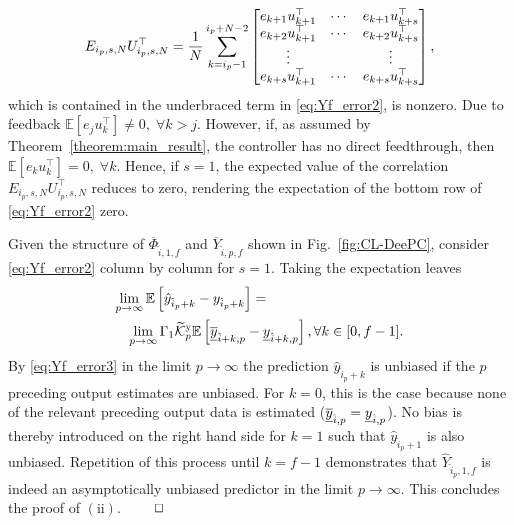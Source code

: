 \begin{align}
E_{i_p,s,N}U_{i_p,s,N}^\top =
    \frac{1}{N}\sum\limits_{k=i_p-1}^{i_p+N-2}
    \begin{bmatrix}
        e_{k+1} u_{k+1}^\top & \cdots & e_{k+1} u_{k+s}^\top\\
        e_{k+2} u_{k+1}^\top & \cdots & e_{k+2} u_{k+s}^\top\\
        \vdots &  & \vdots\\
        e_{k+s}u_{k+1}^\top & \cdots & e_{k+s}u_{k+s}^\top
    \end{bmatrix},\notag%
\end{align}
which is contained in the underbraced term in \eqref{eq:Yf_error2}, is nonzero. Due to feedback $\mathbb{E}[e_j u_k^\top]\neq 0,\;\forall k>j$. However, if, as assumed by Theorem~\ref{theorem:main_result}, the controller has no direct feedthrough, then $\mathbb{E}[e_k u_k^\top]= 0,\;\forall k$. %
Hence, if ${s=1}$, the expected value of the correlation $E_{i_p,s,N}U_{i_p,s,N}^\top$ reduces to zero, rendering the expectation of the bottom row of \eqref{eq:Yf_error2} zero.

Given the structure of $\overline{\Phi}_{\hat{i},1,f}$ and $\overline{Y}_{\hat{i},p,f}$ shown in Fig.~\ref{fig:CL-DeePC}, consider \eqref{eq:Yf_error2} column by column for $s=1$. Taking the expectation leaves
\begin{align}\label{eq:Yf_error3}
\begin{split}
    &\mkern-3mu\lim_{p\rightarrow\infty} \mathbb{E}\left[\hat{y}_{\hat{i}_p+k}-y_{\hat{i}_p+k}\right] = \\ &\;\;\;\lim_{p\rightarrow\infty}\Gamma_1\widetilde{\mathcal{K}}_{p}^{\mathrm{{y}}}\mathbb{E}\left[\underline{\overline{y}}_{\hat{i}+k,p}-\underline{y}_{\hat{i}+k,p}\right],\forall k\in[0,f-1].
\end{split}
\end{align}
By \eqref{eq:Yf_error3} in the limit $p\rightarrow\infty$ the prediction $\hat{y}_{\hat{i}_p+k}$ is unbiased if the $p$ preceding output estimates are unbiased. For $k=0$, this is the case because none of the relevant preceding output data is estimated ($\underline{\overline{y}}_{\hat{i},p}=\underline{y}_{\hat{i},p}$). No bias is thereby introduced on the right hand side for $k=1$ such that $\hat{y}_{\hat{i}_p+1}$ is also unbiased. Repetition of this process until $k=f-1$ demonstrates that $\widehat{Y}_{\hat{i}_p,1,f}$ is indeed an asymptotically unbiased predictor in the limit $p\rightarrow\infty$. This concludes the proof of $\mathrm{(ii)}$. $\hfill\qed$

